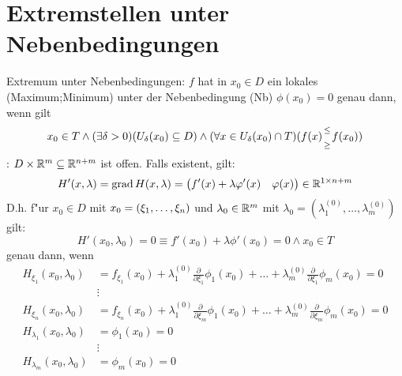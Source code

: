 \section{Extremstellen unter Nebenbedingungen}
 Extremum unter Nebenbedingungen:{
  $f$ hat in $x_0\in D$ ein lokales \tstack(Maximum;Minimum) unter der
  Nebenbedingung (Nb) $\phi(x_0)=0$ genau dann, wenn gilt
  \[x_0\in T \land (\exists \delta>0)(U_\delta(x_0)\subseteq D) \land
    (\forall x \in U_\delta(x_0)\cap T)(f(x)\stack(\leq;\geq)f(x_0))
    \]
  }
\remark:{
  $D\times\mathbb R^m\subseteq\mathbb R^{n+m}$ ist offen.
  Falls existent, gilt:
  \[H'(x,\lambda)=\operatorname{grad} H(x,\lambda)=
    \big(f'(x)+\lambda\varphi'(x)\quad \varphi(x)\big)\in\mathbb R^{1\times n+m}
    \]
  D.h. f"ur $x_0\in D$ mit $x_0=(\xi_1,\ldots,\xi_n)$ und 
  $\lambda_0\in\mathbb R^m$ mit $\lambda_0=(\lambda^{(0)}_1,\ldots,\lambda^{(0)}_m)$ gilt:
  \[H'(x_0,\lambda_0)=0 \equiv f'(x_0)+\lambda\phi'(x_0)=0 \land x_0\in T
    \]
  genau dann, wenn 
  \begin{align*}
    H_{\xi_1}(x_0,\lambda_0)&=
      f_{\xi_1}(x_0)+
      \lambda^{(0)}_1\frac{\partial}{\partial \xi_1} \phi_1(x_0)+\ldots+
      \lambda^{(0)}_m\frac{\partial}{\partial \xi_1} \phi_m(x_0)
      =0 \\
    & \vdots \\
    H_{\xi_n}(x_0,\lambda_0)&=
      f_{\xi_n}(x_0)+
      \lambda^{(0)}_1\frac{\partial}{\partial \xi_m} \phi_1(x_0)+\ldots+
      \lambda^{(0)}_m\frac{\partial}{\partial \xi_m} \phi_m(x_0)
      =0 \\
    H_{\lambda_1}(x_0,\lambda_0)&=
      \phi_1(x_0)=0 \\
    & \vdots \\
    H_{\lambda_m}(x_0,\lambda_0)&=
      \phi_m(x_0)=0
    \end{align*}
  }
